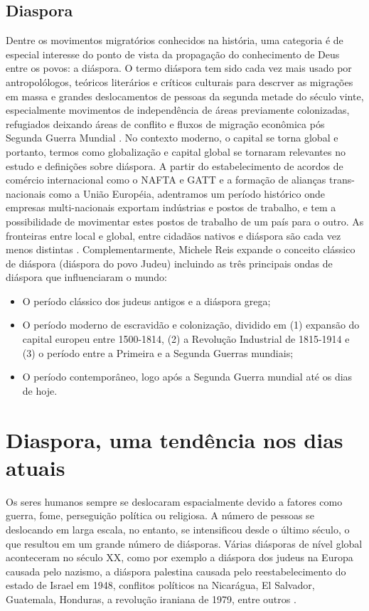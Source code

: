 \documentclass[
	12pt,				%
	openright,			%
	twoside,			%
	a4paper,			%
	english,			%
	french,				%
	spanish,			%
	brazil				%
	]{abntex2}
\begin{document}
\subsection{Diaspora}

Dentre os movimentos migratórios conhecidos na história, uma categoria é de especial interesse do ponto de vista da propagação do conhecimento de Deus entre os povos: a diáspora. O termo diáspora tem sido cada vez mais usado por antropolólogos, teóricos literários e críticos culturais para descrver as migrações em massa e grandes deslocamentos de pessoas da segunda metade do século vinte, especialmente movimentos de independência de áreas previamente colonizadas, refugiados deixando áreas de conflito e fluxos de migração econômica pós Segunda Guerra Mundial \cite[11]{braziel}. No contexto moderno, o capital se torna global e portanto, termos como globalização e capital global se tornaram relevantes no estudo e definições sobre diáspora. A partir do estabelecimento de acordos de comércio internacional como o NAFTA e GATT e a formação de alianças trans-nacionais como a União Européia, adentramos um período histórico onde empresas multi-nacionais exportam indústrias e postos de trabalho, e tem a possibilidade de movimentar estes postos de trabalho de um país para o outro. As fronteiras entre local e global, entre cidadãos nativos e diáspora são cada vez menos distintas \cite[19]{braziel}. Complementarmente, Michele Reis expande o conceito clássico de diáspora (diáspora do povo Judeu) incluindo as três principais ondas de diáspora que influenciaram o mundo: 

\begin{itemize}
	\item O período clássico dos judeus antigos e a diáspora grega;
	\item O período moderno de escravidão e colonização, dividido em (1) expansão do capital europeu entre 1500-1814, (2) a Revolução Industrial de 1815-1914 e (3) o período entre a Primeira e a Segunda Guerras mundiais;
	\item O período contemporâneo, logo após a Segunda Guerra mundial até os dias de hoje.
  \end{itemize}\cite[41-60]{reis}

\section{Diaspora, uma tendência nos dias atuais}

Os seres humanos sempre se deslocaram espacialmente devido a fatores como guerra, fome, perseguição política ou religiosa. A número de pessoas se deslocando em larga escala, no entanto, se intensificou desde o último século, o que resultou em um grande número de diásporas. Várias diásporas de nível global aconteceram no século XX, como por exemplo a diáspora dos judeus na Europa causada pelo nazismo, a diáspora palestina causada pelo reestabelecimento do estado de Israel em 1948, conflitos políticos na Nicarágua, El Salvador, Guatemala, Honduras, a revolução iraniana de 1979, entre outros \cite[25]{wan_diaspora_2011}.
\end{document}
